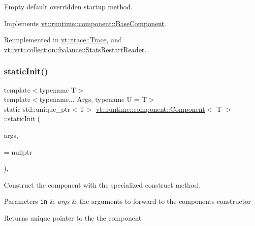 Empty default overridden startup method. 



Implements \hyperlink{structvt_1_1runtime_1_1component_1_1_base_component_a8bf92f9f0a7027abf7deaefa2e7f5202}{vt\+::runtime\+::component\+::\+Base\+Component}.



Reimplemented in \hyperlink{structvt_1_1trace_1_1_trace_a5dd8767d9020ebeaba49ea3a684738a1}{vt\+::trace\+::\+Trace}, and \hyperlink{structvt_1_1vrt_1_1collection_1_1balance_1_1_stats_restart_reader_a0a2bd4e4f989766216237d6aedfaaa51}{vt\+::vrt\+::collection\+::balance\+::\+Stats\+Restart\+Reader}.

\mbox{\label{structvt_1_1runtime_1_1component_1_1_component_a7d82b061566ef21d6438f4701ae6b733}} 
\subsubsection{\texorpdfstring{static\+Init()}{staticInit()}\hspace{0.1cm}{\footnotesize\ttfamily [1/2]}}
{\footnotesize\ttfamily template$<$typename T$>$ \\
template$<$typename... Args, typename U  = T$>$ \\
static std\+::unique\+\_\+ptr$<$T$>$ \hyperlink{structvt_1_1runtime_1_1component_1_1_component}{vt\+::runtime\+::component\+::\+Component}$<$ T $>$\+::static\+Init (\begin{DoxyParamCaption}\item[{Args \&\&...}]{args,  }\item[{\hyperlink{structvt_1_1runtime_1_1component_1_1_component_aca5f3a7c1db697b6d0ba70de7ff8b887}{has\+Cons}$<$ U $>$ $\ast$}]{ = {\ttfamily nullptr} }\end{DoxyParamCaption})\hspace{0.3cm}{\ttfamily [inline]}, {\ttfamily [static]}}



Construct the component with the specialized construct method. 


\begin{DoxyParams}[1]{Parameters}
\mbox{\tt in}  & {\em args} & the arguments to forward to the component\textquotesingle{}s constructor\\
\hline
\end{DoxyParams}
\begin{DoxyReturn}{Returns}
unique pointer to the the component 
\end{DoxyReturn}
\mbox{\label{structvt_1_1runtime_1_1component_1_1_component_aaada4d04e8adf4cc5556bed2fdcdb321}} 
